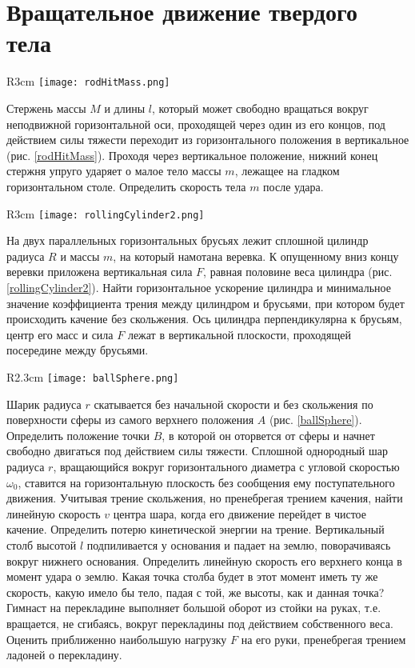 \section{Вращательное движение твердого тела}
\begin{wrapfigure}[8]{R}{3cm}
\texttt{[image: rodHitMass.png]}
\caption{}
\label{rodHitMass}
\end{wrapfigure}
\AddProb Стержень массы $M$ и длины $l$, который может свободно
вращаться вокруг неподвижной горизонтальной оси, проходящей через
один из его концов, под действием силы тяжести переходит из горизонтального положения в вертикальное (рис. \ref{rodHitMass}). Проходя через вертикальное положение, нижний конец стержня упруго ударяет о малое тело массы $m$, лежащее на гладком горизонтальном столе. Определить скорость тела $m$ после удара.

\begin{wrapfigure}[9]{R}{3cm}
\texttt{[image: rollingCylinder2.png]}
\caption{}
\label{rollingCylinder2}
\end{wrapfigure}
\AddProb На двух параллельных горизонтальных брусьях лежит сплошной цилиндр радиуса $R$ и массы $m$, на который намотана веревка. К опущенному вниз концу веревки приложена вертикальная сила $F$, равная половине веса цилиндра (рис. \ref{rollingCylinder2}). Найти горизонтальное ускорение цилиндра и минимальное значение коэффициента трения между цилиндром и брусьями, при котором будет происходить качение без скольжения. Ось цилиндра перпендикулярна к брусьям, центр его масс и сила $F$ лежат в вертикальной плоскости, проходящей посередине между брусьями.

\begin{wrapfigure}[10]{R}{2.3cm}
\texttt{[image: ballSphere.png]}
\caption{}
\label{ballSphere}
\end{wrapfigure}
\AddProb Шарик радиуса $r$ скатывается без начальной скорости и без скольжения по поверхности сферы из самого верхнего положения $A$ (рис. \ref{ballSphere}). Определить положение точки $B$, в которой он оторвется от сферы и начнет свободно двигаться под действием силы тяжести.
\AddProb Сплошной однородный шар радиуса $r$, вращающийся вокруг
горизонтального диаметра с угловой скоростью $\omega_0$, ставится на горизонтальную плоскость без сообщения ему поступательного движения. Учитывая трение скольжения, но пренебрегая трением качения, найти линейную скорость $v$ центра шара, когда его движение перейдет в чистое качение. Определить потерю кинетической энергии на трение.
\AddProb Вертикальный столб высотой $l$ подпиливается у основания и падает на землю, поворачиваясь вокруг нижнего основания. Определить линейную скорость его верхнего конца в момент удара о землю. Какая точка столба будет в этот момент иметь ту же скорость, какую имело бы тело, падая с той, же высоты, как и данная точка?
\AddProb Гимнаст на перекладине выполняет большой оборот из стойки на руках, т.е. вращается, не сгибаясь, вокруг перекладины под действием собственного веса. Оценить приближенно наибольшую нагрузку $F$ на его руки, пренебрегая трением ладоней о перекладину.

